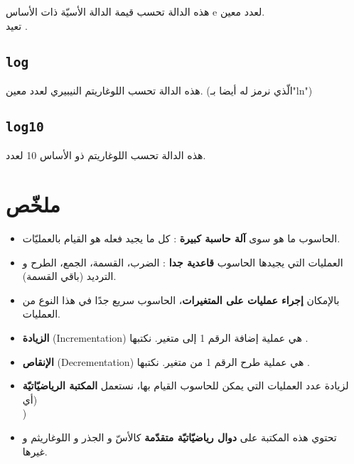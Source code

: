 هذه الدالة تحسب قيمة الدالة الأسيّة ذات الأساس
\textenglish{e}
لعدد معين.\\
تعيد
.

\subsection{\texttt{log}}

هذه الدالة تحسب اللوغاريتم النيبيري لعدد معين. (الّذي نرمز له أيضا بـ"\textenglish{ln}")

\subsection{\texttt{log10}}

هذه الدالة تحسب اللوغاريتم ذو الأساس 10 لعدد.

\section*{ملخّص}

\begin{itemize}
  \item الحاسوب ما هو سوى
\textbf{آلة حاسبة كبيرة}
: كل ما يجيد فعله هو القيام بالعمليّات.
  \item العمليات التي يجيدها الحاسوب
\textbf{قاعدية جدا}
: الضرب، القسمة، الجمع، الطرح و الترديد (باقي القسمة).
  \item بالإمكان
\textbf{إجراء عمليات على المتغيرات}،
الحاسوب سريع جدًا في هذا النوع من العمليات.
  \item \textbf{الزيادة}
(\textenglish{Incrementation})
هي عملية إضافة الرقم 1 إلى متغير. نكتبها
.
  \item \textbf{الإنقاص}
(\textenglish{Decrementation})
هي عملية طرح الرقم 1 من متغير. نكتبها
.
  \item لزيادة عدد العمليات التي يمكن للحاسوب القيام بها، نستعمل
\textbf{المكتبة الرياضيّاتيّة}
(أي\\
)
  \item تحتوي هذه المكتبة على
\textbf{دوال رياضيّاتيّة متقدّمة}
كالأسّ و الجذر و اللوغاريثم و غيرها.
\end{itemize}
